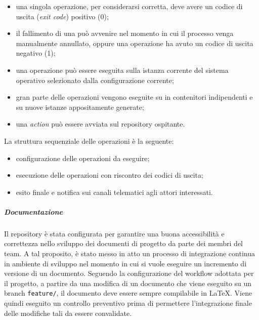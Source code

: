 		\begin{itemize}
			\item una singola operazione, per considerarsi corretta, deve avere un codice di uscita (\textit{exit code}) positivo (0);
			\item il fallimento di una  può avvenire nel momento in cui il processo venga manualmente annullato, oppure una operazione ha avuto un codice di uscita negativo (1);
			\item una operazione può essere eseguita sulla istanza corrente del sistema operativo selezionato dalla configurazione corrente;
			\item gran parte delle operazioni vengono eseguite su  in contenitori indipendenti e su nuove istanze appositamente generate;
			\item una \textit{action} può essere avviata sul repository ospitante.
		\end{itemize}

		La struttura sequenziale delle operazioni è la seguente:

		\begin{itemize}
			\item configurazione delle operazioni da eseguire;
			\item esecuzione delle operazioni con riscontro dei codici di uscita;
			\item esito finale e notifica sui canali telematici agli attori interessati.
		\end{itemize}

		\subparagraph{Documentazione}

		Il repository è stata configurata per garantire una buona accessibilità e correttezza nello sviluppo dei documenti di progetto da parte dei membri del team. A tal proposito, è stato messo in atto un processo di integrazione continua in ambiente di sviluppo nel momento in cui si vuole eseguire un incremento di versione di un documento. 
		Seguendo la configurazione del workflow adottata per il progetto, a partire da una modifica di un documento che viene eseguito su un branch \verb!feature/!, il documento deve essere sempre compilabile in \LaTeX{}. 
		Viene quindi eseguito un controllo preventivo prima di permettere l'integrazione finale delle modifiche tali da essere convalidate.

